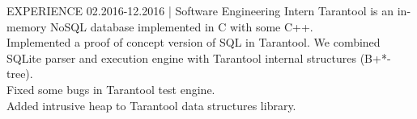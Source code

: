 \documentclass[12pt]{cutecv}
\begin{document}
\begin{paracol}{2}
\begin{rightcolumn}
\begin{cvsection}{EXPERIENCE}
  {02.2016-12.2016 | Software Engineering Intern}
  {Tarantool is an in-memory NoSQL database implemented in C with some C++.\\
   Implemented a proof of concept version of SQL in Tarantool.
   We combined SQLite parser and execution engine with Tarantool internal structures (B+*-tree).\\
   Fixed some bugs in Tarantool test engine.\\
   Added intrusive heap to Tarantool data structures library.}
\end{cvsection}

\end{rightcolumn}
\end{paracol}
\end{document}
